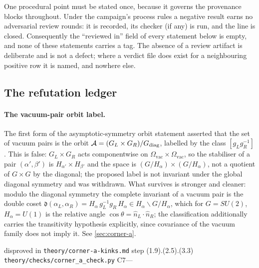 One procedural point must be stated once, because it governs the provenance
blocks throughout. Under the campaign's process rules a negative result earns
no adversarial review rounds: it is recorded, its checker (if any) is run, and
the line is closed. Consequently the ``reviewed in'' field of every statement
below is empty, and none of these statements carries a \statusProved tag. The
absence of a review artifact is deliberate and is not a defect; where a
verdict file does exist for a neighbouring positive row it is named, and
nowhere else.

\subsection{The refutation ledger}
\label{sub:refutation-ledger}

\paragraph{The vacuum-pair orbit label.} \statusRefuted{} The first form of
the asymptotic-symmetry orbit statement asserted that the set of vacuum pairs
is the orbit $\mathcal{A} = (G_L \times G_R)/G_{\mathrm{diag}}$, labelled by the class
$[g_L g_R^{-1}]$. This is false: $G_L \times G_R$ acts componentwise on
$\Omega_{\mathrm{vac}} \times \Omega_{\mathrm{vac}}$, so the stabiliser of a
pair $(\alpha',\beta')$ is $H_{\alpha'} \times H_{\beta'}$ and the space is
$(G/H_\alpha) \times (G/H_\alpha)$, not a quotient of $G \times G$ by the
diagonal; the proposed label is not invariant under the global diagonal
symmetry and was withdrawn. What survives is stronger and cleaner: modulo the
diagonal symmetry the complete invariant of a vacuum pair is the double coset
$\mathfrak{d}(\alpha_L,\alpha_R) = H_\alpha\, g_L^{-1} g_R\, H_\alpha \in
H_\alpha \backslash G / H_\alpha$, which for $G=SU(2)$, $H_\alpha=U(1)$ is the
relative angle $\cos\theta = \hat n_L \cdot \hat n_R$; the classification
additionally carries the transitivity hypothesis explicitly, since covariance
of the vacuum family does not imply it. See \cref{sec:corner-a}.

%
{disproved in \texttt{theory/corner-a-kinks.md} step (1.9).(2.5).(3.3)}%
{\texttt{theory/checks/corner\_a\_check.py} C7}{---}

